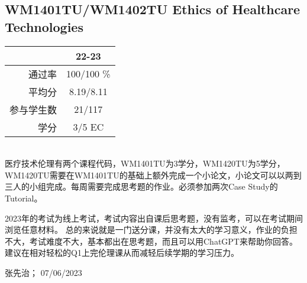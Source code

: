\subsection{WM1401TU/WM1402TU Ethics of Healthcare Technologies}\hypertarget{WM1401TU}{} 
\begin{minipage}{0.45\textwidth}
\centering
{}
\end{minipage}%
\begin{minipage}{0.45\textwidth}
\raggedleft
\begin{tabular}{r|c}
\textbf{ } & \textbf{22-23} \\ \hline
通过率 &100/100 \% \\ 
平均分 & 8.19/8.11 \\ 
参与学生数 &21/117 \\
学分 & 3/5 EC\\
\end{tabular}
\end{minipage}\\

医疗技术伦理有两个课程代码，WM1401TU为3学分，WM1420TU为5学分，WM1420TU需要在WM1401TU的基础上额外完成一个小论文，小论文可以以两到三人的小组完成。每周需要完成思考题的作业。必须参加两次Case Study的Tutorial。

2023年的考试为线上考试，考试内容出自课后思考题，没有监考，可以在考试期间浏览任意材料。
总的来说就是一门送分课，并没有太大的学习意义，作业的负担不大，考试难度不大，基本都出在思考题，而且可以用ChatGPT来帮助你回答。建议在相对轻松的Q1上完伦理课从而减轻后续学期的学习压力。
\begin{flushright}
张先治； 07/06/2023
\end{flushright}

